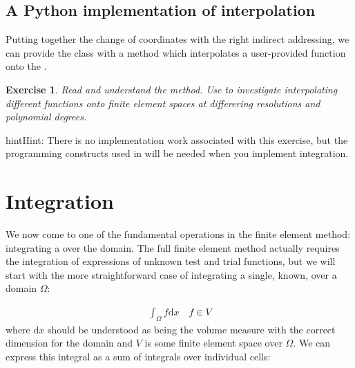 \documentclass{book}
\newtheorem{exercise}{Exercise}
\begin{document}
\subsection{A Python implementation of interpolation}
\label{\detokenize{5_functions:a-python-implementation-of-interpolation}}
Putting together the change of coordinates with the right indirect
addressing, we can provide the
 class with a
 method which
interpolates a user-provided function onto the
.

\begin{exercise}
Read and understand the
 method. Use
 to investigate interpolating different
functions onto finite element spaces at differering resolutions and
polynomial degrees.
\end{exercise}
\begin{sphinxadmonition}{hint}{Hint:}
There is no implementation work associated with this exercise, but
the programming constructs used in
 will be
needed when you implement integration.
\end{sphinxadmonition}


\section{Integration}
\label{\detokenize{5_functions:id1}}\label{\detokenize{5_functions:integration}}
We now come to one of the fundamental operations in the finite element
method: integrating a  over
the domain. The full finite element method actually requires the
integration of expressions of unknown test and trial functions, but we
will start with the more straightforward case of integrating a single,
known,  over a domain
\(\Omega\):

\label{\detokenize{5_functions:equation-5_functions:3}}\begin{equation}\label{equation:5_functions:5_functions:3}
\begin{split}\int_\Omega f \mathrm{d} x \quad f \in V\end{split}
\end{equation}
where \(\mathrm{d}x\) should be understood as being the volume measure
with the correct dimension for the domain and \(V\) is some finite
element space over \(\Omega\). We can express this integral as a sum of
integrals over individual cells:
\end{document}
